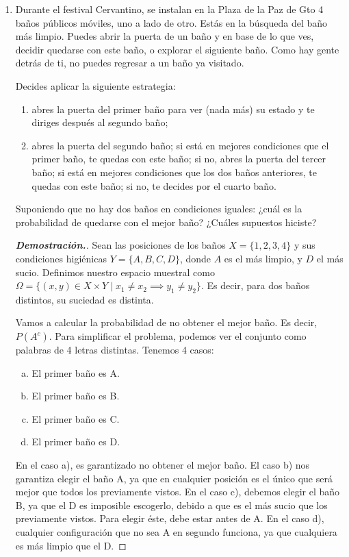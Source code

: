 \documentclass{article}
\begin{document}
	
	\begin{enumerate}
		
		
		\item Durante el festival Cervantino, se instalan en la Plaza de la Paz de Gto 4 ba\~nos p\'ublicos m\'oviles, uno a lado de otro. Est\'as en la b\'usqueda del ba\~no m\'as limpio. Puedes abrir la puerta de un ba\~no y en base de lo que ves, decidir quedarse con este ba\~no, o explorar el siguiente ba\~no. Como hay gente detr\'as de ti, no puedes regresar a un ba\~no ya visitado.
		
		Decides aplicar la siguiente estrategia:
		\begin{enumerate}[\textbullet]
			\item abres la puerta del primer ba\~no para ver (nada m\'as) su estado y te diriges despu\'es al segundo ba\~no;
			\item abres la puerta del segundo ba\~no; si est\'a en mejores condiciones que el primer ba\~no, te quedas con este ba\~no; si no, abres la puerta del tercer ba\~no; si est\'a en mejores condiciones que los dos ba\~nos anteriores, te quedas con este ba\~no; si no, te decides por el cuarto ba\~no.
		\end{enumerate}
		Suponiendo que no hay dos ba\~nos en condiciones iguales: ¿cu\'al es la probabilidad de quedarse con el mejor ba\~no? ¿Cu\'ales supuestos hiciste?
		\begin{mdframed}[
			linecolor=darkgray,
			backgroundcolor=pearl]
			\begin{proof}[\textbf{Demostraci\'on.}]
				Sean las posiciones de los ba\~nos $X = \{1,2,3,4\}$ y sus condiciones higi\'enicas $Y = \{A,B,C,D\}$, donde $A$ es el m\'as limpio, y $D$ el m\'as sucio. Definimos nuestro espacio muestral como $\Omega = \{(x,y) \in X\times Y \;|\; x_1 \neq x_2 \implies y_1\neq y_2 \}$. Es decir, para dos ba\~nos distintos, su suciedad es distinta.
				
				Vamos a calcular la probabilidad de no obtener el mejor ba\~no. Es decir, $P(A^c)$. Para simplificar el problema, podemos ver el conjunto como palabras de 4 letras distintas. Tenemos 4 casos:
				\begin{enumerate}[a)]
					\item El primer ba\~no es A.
					\item El primer ba\~no es B.
					\item El primer ba\~no es C.
					\item El primer ba\~no es D.
				\end{enumerate}
				En el caso a), es garantizado no obtener el mejor ba\~no. El caso b) nos garantiza elegir el ba\~no A, ya que en cualquier posici\'on es el \'unico que ser\'a mejor que todos los previamente vistos. En el caso c), debemos elegir el ba\~no B, ya que el D es imposible escogerlo, debido a que es el m\'as sucio que los previamente vistos. Para elegir \'este, debe estar antes de A. En el caso d), cualquier configuraci\'on que no sea A en segundo funciona, ya que cualquiera es m\'as limpio que el D.
				

\end{proof}
\end{mdframed}
\end{enumerate}
\end{document}
